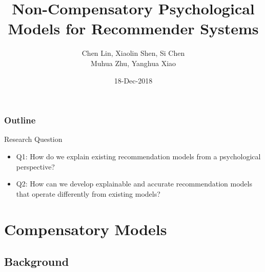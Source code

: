\documentclass[xcolor=dvipsnames]{beamer}
\title[Non-Compensatory Recommendation]{Non-Compensatory Psychological Models for Recommender Systems}
\author[Chen Lin]{Chen Lin, Xiaolin Shen, Si Chen\inst{1} \\ Muhua Zhu, Yanghua Xiao \inst{2}}
\institute[XMU]{
\inst{1}
Xiamen University \\
\inst{2}
Alibaba Group \\
}
\date{18-Dec-2018}
\begin{document}


\begin{frame}
  \titlepage
\end{frame}

\begin{frame}
\frametitle{Outline}
\tableofcontents
\end{frame}



\begin{frame}{Research Question}
    \begin{itemize}
        \item Q1: How do we explain existing recommendation models from a psychological perspective?
        \item Q2: How can we develop explainable and accurate recommendation models that operate differently from existing models?
    \end{itemize}
\end{frame}

\section{Compensatory Models}

\subsection{Background}
\end{document}

